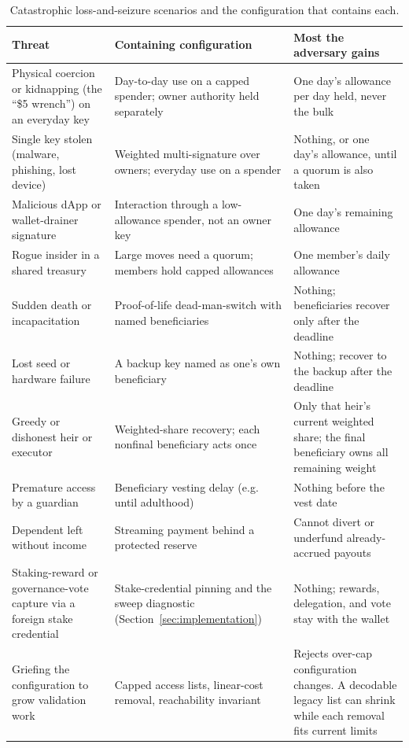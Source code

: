 \documentclass[11pt,DIV=11,parskip=half-]{scrartcl}
\begin{document}
\begin{table}[ht]
\centering\small
\renewcommand{\arraystretch}{1.3}
\begin{tabularx}{\linewidth}{@{}X X X@{}}
\toprule
\textbf{Threat} & \textbf{Containing configuration} & \textbf{Most the adversary gains} \\
\midrule
Physical coercion or kidnapping (the ``\$5 wrench'') on an everyday key & Day-to-day use on a capped spender; owner authority held separately & One day's allowance per day held, never the bulk \\
Single key stolen (malware, phishing, lost device) & Weighted multi-signature over owners; everyday use on a spender & Nothing, or one day's allowance, until a quorum is also taken \\
Malicious dApp or wallet-drainer signature & Interaction through a low-allowance spender, not an owner key & One day's remaining allowance \\
Rogue insider in a shared treasury & Large moves need a quorum; members hold capped allowances & One member's daily allowance \\
Sudden death or incapacitation & Proof-of-life dead-man-switch with named beneficiaries & Nothing; beneficiaries recover only after the deadline \\
Lost seed or hardware failure & A backup key named as one's own beneficiary & Nothing; recover to the backup after the deadline \\
Greedy or dishonest heir or executor & Weighted-share recovery; each nonfinal beneficiary acts once & Only that heir's current weighted share; the final beneficiary owns all remaining weight \\
Premature access by a guardian & Beneficiary vesting delay (e.g. until adulthood) & Nothing before the vest date \\
Dependent left without income & Streaming payment behind a protected reserve & Cannot divert or underfund already-accrued payouts \\
Staking-reward or governance-vote capture via a foreign stake credential & Stake-credential pinning and the sweep diagnostic (Section~\ref{sec:implementation}) & Nothing; rewards, delegation, and vote stay with the wallet \\
Griefing the configuration to grow validation work & Capped access lists, linear-cost removal, reachability invariant & Rejects over-cap configuration changes. A decodable legacy list can shrink while each removal fits current limits \\
\bottomrule
\end{tabularx}
\caption{Catastrophic loss-and-seizure scenarios and the configuration that contains each.}
\label{tab:threats}
\end{table}
\end{document}
